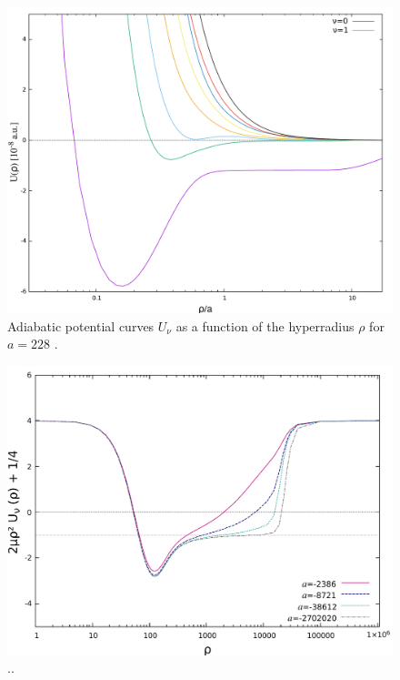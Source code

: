 \begin{figure}
	\includegraphics[width=\linewidth]{adiabatic.pdf}
	\caption{Adiabatic potential curves $U_{\nu}$ as a function of the hyperradius $\rho$ for $a=228 $ .}
	\label{fig:res_2}
\end{figure}

\begin{figure}
	\includegraphics[width=\linewidth]{plotneg_dashed.pdf}
	\caption{..}
	\label{fig:res_3}
\end{figure}

